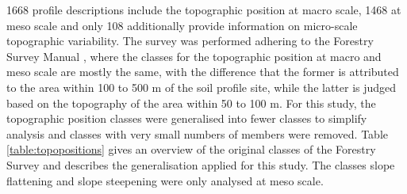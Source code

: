 \documentclass[preprint,12pt,authoryear]{elsarticle}
\begin{document}
1668 profile descriptions include  the topographic position at macro scale, 1468 at meso scale and only 108 additionally provide information on micro-scale topographic variability. The survey was performed adhering to the Forestry Survey Manual \citep{Englisch1998}, where the classes for the topographic position at macro and meso scale are mostly the same, with the difference that the former is attributed to the area within 100 to 500 m of the soil profile site, while the latter is judged based on the topography of the area within 50 to 100 m. For this study, the topographic position classes were generalised into fewer classes to simplify  analysis and classes with very small numbers of members were removed. Table \ref{table:topopositions} gives an overview of the original classes of the Forestry Survey and describes the generalisation applied for this study. The classes slope flattening and slope steepening were only analysed at meso scale.
\end{document}
